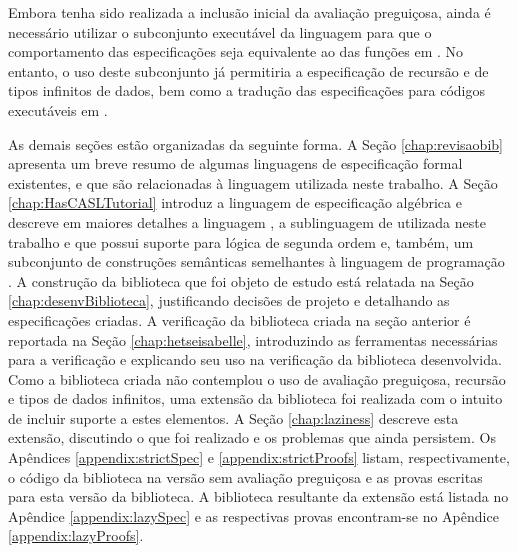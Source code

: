 Embora tenha sido realizada a inclusão inicial da avaliação preguiçosa, ainda é necessário utilizar o subconjunto executável da linguagem \HasCASL para que o comportamento das especificações seja equivalente ao das funções em \Haskell.
No entanto, o uso deste subconjunto já permitiria a especificação de recursão e de tipos infinitos de dados, bem como a tradução das especificações para códigos executáveis em \Haskell.

As demais seções estão organizadas da seguinte forma.
A Seção \ref{chap:revisaobib} apresenta um breve resumo de algumas linguagens de especificação formal existentes, e que são relacionadas à linguagem utilizada neste trabalho.
A Seção \ref{chap:HasCASLTutorial} introduz a linguagem de especificação algébrica \CASL e descreve em maiores detalhes a linguagem \HasCASL, a sublinguagem de \CASL utilizada neste trabalho e que possui suporte para lógica de segunda ordem e, também, um subconjunto de construções semânticas semelhantes à linguagem de programação \Haskell.
A construção da biblioteca que foi objeto de estudo está relatada na Seção \ref{chap:desenvBiblioteca}, justificando decisões de projeto e detalhando as especificações criadas.
A verificação da biblioteca criada na seção anterior é reportada na Seção \ref{chap:hetseisabelle}, introduzindo as ferramentas necessárias para a verificação e explicando seu uso na verificação da biblioteca desenvolvida.
Como a biblioteca criada não contemplou o uso de avaliação preguiçosa, recursão e tipos de dados infinitos, uma extensão da biblioteca foi realizada com o intuito de incluir suporte a estes elementos. A Seção \ref{chap:laziness} descreve esta extensão, discutindo o que foi realizado e os problemas que ainda persistem.
Os Apêndices \ref{appendix:strictSpec} e \ref{appendix:strictProofs} listam, respectivamente, o código da biblioteca na versão sem avaliação preguiçosa e as provas escritas para esta versão da biblioteca. A biblioteca resultante da extensão está listada no Apêndice \ref{appendix:lazySpec} e as respectivas provas encontram-se no Apêndice \ref{appendix:lazyProofs}.

